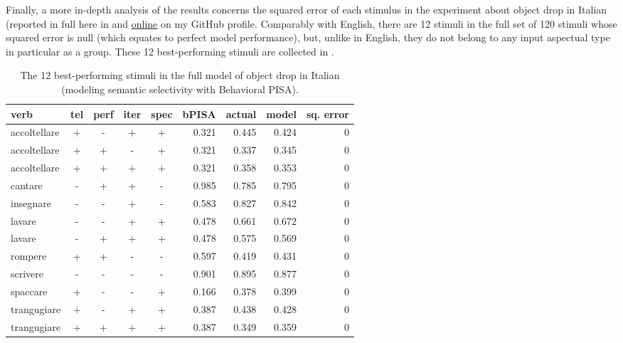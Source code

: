 Finally, a more in-depth analysis of the results concerns the squared error of each stimulus in the experiment about object drop in Italian (reported in full here in  and \href{https://github.com/giuliacappelli/dissertationData}{online} on my GitHub profile. Comparably with English, there are 12 stimuli in the full set of 120 stimuli whose squared error is null (which equates to perfect model performance), but, unlike in English, they do not belong to any input aspectual type in particular as a group. These 12 best-performing stimuli are collected in . %

\begin{table}[htb] %
\caption{The 12 best-performing stimuli in the full model of object drop in Italian (modeling semantic selectivity with Behavioral PISA).}
\begin{tabular}{l|ccccr|rrr}
\textbf{verb}  & \textbf{tel} & \textbf{perf} & \textbf{iter} & \textbf{spec} & \textbf{bPISA}   & \textbf{actual} & \textbf{model} & \textbf{sq. error} \\
\hline
accoltellare & +  & -   & +   & +     & 0.321 & 0.445  & 0.424     & 0             \\
accoltellare & +  & +   & -   & +     & 0.321 & 0.337  & 0.345     & 0             \\
accoltellare & +  & +   & +   & +     & 0.321 & 0.358  & 0.353     & 0             \\
cantare      & -  & +   & +   & -     & 0.985 & 0.785  & 0.795     & 0             \\
insegnare    & -  & -   & +   & -     & 0.583 & 0.827  & 0.842     & 0             \\
lavare       & -  & -   & +   & +     & 0.478 & 0.661  & 0.672     & 0             \\
lavare       & -  & +   & +   & +     & 0.478 & 0.575  & 0.569     & 0             \\
rompere      & +  & +   & -   & -     & 0.597 & 0.419  & 0.431     & 0             \\
scrivere     & -  & -   & -   & -     & 0.901 & 0.895  & 0.877     & 0             \\
spaccare     & +  & -   & -   & +     & 0.166 & 0.378  & 0.399     & 0             \\
trangugiare  & +  & -   & +   & +     & 0.387 & 0.438  & 0.428     & 0             \\
trangugiare  & +  & +   & +   & +     & 0.387 & 0.349  & 0.359     & 0            
\end{tabular}
\end{table}

